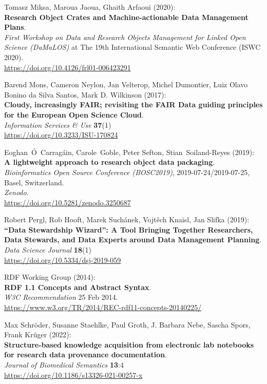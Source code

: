 \begin{thebibliography}{9}
Tomasz Miksa, Maroua Jaoua, Ghaith Arfaoui (2020):\\
\textbf{Research Object Crates and Machine-actionable Data Management
Plans}.\\
\emph{First Workshop on Data and Research Objects Management for Linked
Open Science (DaMaLOS)} at The 19th International Semantic Web
Conference (ISWC 2020).\\
\url{https://doi.org/10.4126/frl01-006423291}

Barend Mons, Cameron Neylon, Jan Velterop, Michel
Dumontier, Luiz Olavo Bonino da Silva Santos, Mark D. Wilkinson
(2017):\\
\textbf{Cloudy, increasingly FAIR; revisiting the FAIR Data guiding
principles for the European Open Science Cloud}.\\
\emph{Information Services \& Use} \textbf{37}(1)\\
\url{https://doi.org/10.3233/ISU-170824}

Eoghan~Ó~Carragáin, Carole~Goble, Peter Sefton,
Stian~Soiland-Reyes (2019):\\
\textbf{A lightweight approach to research object data packaging}.\\
\emph{Bioinformatics Open Source Conference (BOSC2019)},
2019-07-24/2019-07-25, Basel, Switzerland.\\
\emph{Zenodo}.\\
\url{https://doi.org/10.5281/zenodo.3250687}

Robert Pergl, Rob Hooft, Marek Suchánek, Vojtěch
Knaisl, Jan Slifka (2019):\\
\textbf{``Data Stewardship Wizard'': A Tool Bringing Together
Researchers, Data Stewards, and Data Experts around Data Management
Planning}.\\
\emph{Data Science Journal} \textbf{18}(1)\\
\url{https://doi.org/10.5334/dsj-2019-059}

RDF Working Group (2014):\\
\textbf{RDF 1.1 Concepts and Abstract Syntax}.\\
\emph{W3C Recommendation} 25 Feb 2014.\\
\url{https://www.w3.org/TR/2014/REC-rdf11-concepts-20140225/}

Max Schröder, Susanne Staehlke, Paul Groth, J.
Barbara Nebe, Sascha Spors, Frank Krüger (2022):\\
\textbf{Structure-based knowledge acquisition from electronic lab
notebooks for research data provenance documentation}.\\
\emph{Journal of Biomedical Semantics} \textbf{13}:4\\
\url{https://doi.org/10.1186/s13326-021-00257-x}


\end{thebibliography}
